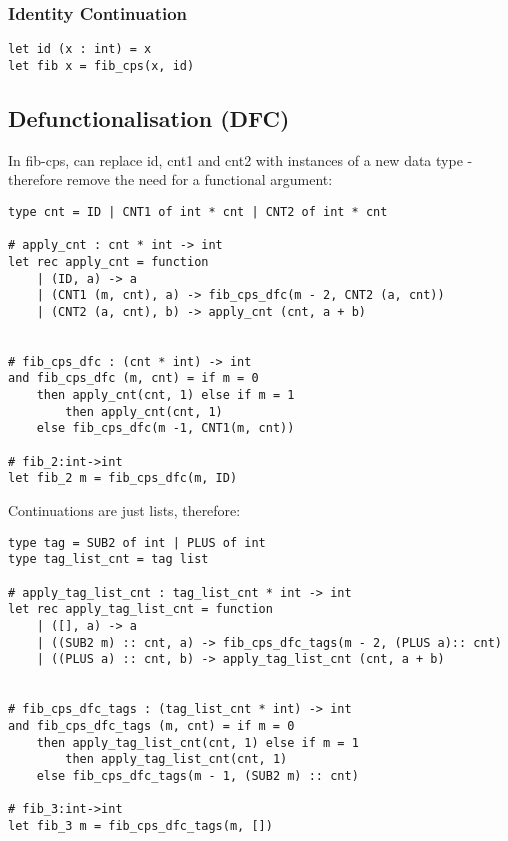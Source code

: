 \documentclass{article}
\begin{document}
\subsubsection{Identity Continuation}
\begin{lstlisting}
let id (x : int) = x
let fib x = fib_cps(x, id)
\end{lstlisting}

\subsection{Defunctionalisation (DFC)}
In fib-cps, can replace id, cnt1 and cnt2 with instances of a new data type - therefore remove the need for a functional argument:
\begin{lstlisting}
type cnt = ID | CNT1 of int * cnt | CNT2 of int * cnt

# apply_cnt : cnt * int -> int 
let rec apply_cnt = function
	| (ID, a) -> a
	| (CNT1 (m, cnt), a) -> fib_cps_dfc(m - 2, CNT2 (a, cnt)) 
	| (CNT2 (a, cnt), b) -> apply_cnt (cnt, a + b)
	
	
# fib_cps_dfc : (cnt * int) -> int 
and fib_cps_dfc (m, cnt) = if m = 0
	then apply_cnt(cnt, 1) else if m = 1
		then apply_cnt(cnt, 1)
	else fib_cps_dfc(m -1, CNT1(m, cnt))
	
# fib_2:int->int
let fib_2 m = fib_cps_dfc(m, ID)
\end{lstlisting}

Continuations are just lists, therefore: 
\begin{lstlisting}
type tag = SUB2 of int | PLUS of int
type tag_list_cnt = tag list

# apply_tag_list_cnt : tag_list_cnt * int -> int 
let rec apply_tag_list_cnt = function
	| ([], a) -> a
	| ((SUB2 m) :: cnt, a) -> fib_cps_dfc_tags(m - 2, (PLUS a):: cnt) 
	| ((PLUS a) :: cnt, b) -> apply_tag_list_cnt (cnt, a + b)	
	
	
# fib_cps_dfc_tags : (tag_list_cnt * int) -> int 
and fib_cps_dfc_tags (m, cnt) = if m = 0
	then apply_tag_list_cnt(cnt, 1) else if m = 1
		then apply_tag_list_cnt(cnt, 1)
	else fib_cps_dfc_tags(m - 1, (SUB2 m) :: cnt)					
	
# fib_3:int->int
let fib_3 m = fib_cps_dfc_tags(m, [])
\end{lstlisting}
\end{document}
